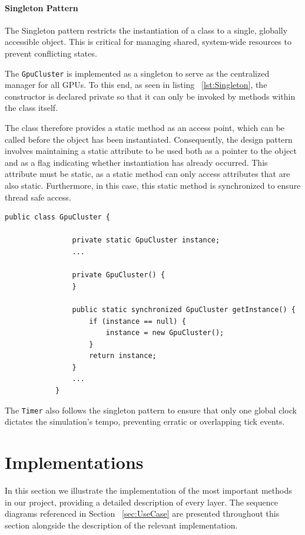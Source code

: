 \documentclass[a4paper,11pt]{report}
\begin{document}
	
    \subsubsection{Singleton Pattern}
    \label{subsub:Singleton}
    The Singleton pattern restricts the instantiation of a class to a single, globally accessible object. This is critical for managing shared, system-wide resources to prevent conflicting states.
    \smallskip
    
    The \texttt{GpuCluster} is implemented as a singleton to serve as the centralized manager for all GPUs. To this end, as seen in listing ~\vref{lst:Singleton}, the constructor is declared private so that it can only be invoked by methods within the class itself.
    
    The class therefore provides a static method as an access point, which can be called before the object has been instantiated. Consequently, the design pattern involves maintaining a static attribute to be used both as a pointer to the object and as a flag indicating whether instantiation has already occurred. This attribute must be static, as a static method can only access attributes that are also static. Furthermore, in this case, this static method is synchronized to ensure thread safe access.
    
    \begin{minipage}{\linewidth}
    	\begin{lstlisting}[caption={GpuCluster singleton design pattern implementation}, label = {lst:Singleton}]
    		public class GpuCluster {
    			
    			private static GpuCluster instance;
    			...
    			
    			private GpuCluster() {
    			}
    			
    			public static synchronized GpuCluster getInstance() {
    				if (instance == null) {
    					instance = new GpuCluster();
    				}
    				return instance;
    			}
    			...
    		}
    	\end{lstlisting}
    \end{minipage}

    \smallskip
    The \texttt{Timer} also follows the singleton pattern to ensure that only one global clock dictates the simulation's tempo, preventing erratic or overlapping tick events. 
    
    \chapter{Implementations}
    In this section we illustrate the implementation of the most important methods in our project, providing a detailed description of every layer. The sequence diagrams referenced in Section ~\ref{sec:UseCase} are presented throughout this section alongside the description of the relevant implementation.
    
\end{document}
